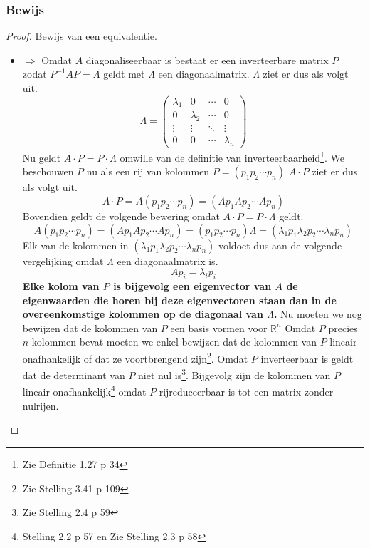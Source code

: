 \documentclass[lineaire_algebra_oplossingen.tex]{subfiles}
\begin{document}
\subsubsection*{Bewijs}
\begin{proof}
Bewijs van een equivalentie.
\begin{itemize}
\item $\Rightarrow$
Omdat $A$ diagonaliseerbaar is bestaat er een inverteerbare matrix $P$ zodat $P^{-1}AP = \Lambda$ geldt met $\Lambda$ een diagonaalmatrix. $\Lambda$ ziet er dus als volgt uit.
\[
\Lambda =
\begin{pmatrix}
\lambda_1 & 0 & \cdots & 0\\
0 & \lambda_2 & \cdots & 0\\
\vdots & \vdots & \ddots & \vdots\\
0 & 0 & \cdots & \lambda_n
\end{pmatrix}
\]
Nu geldt $A \cdot P = P \cdot \Lambda$ omwille van de definitie van inverteerbaarheid\footnote{Zie Definitie 1.27 p 34}.
We beschouwen $P$ nu als een rij van kolommen $P=(p_1 p_2 \cdots p_n)$
$A\cdot P$ ziet er dus als volgt uit.
\[
A\cdot P = A(p_1 p_2 \cdots p_n) = (Ap_1 Ap_2 \cdots Ap_n)
\]
Bovendien geldt de volgende bewering omdat $A \cdot P = P \cdot \Lambda$ geldt.
\[
A(p_1 p_2 \cdots p_n) = (Ap_1 Ap_2 \cdots Ap_n) = (p_1 p_2 \cdots p_n)\Lambda = (\lambda_1p_1 \lambda_2p_2 \cdots \lambda_np_n)
\]
Elk van de kolommen in $(\lambda_1p_1 \lambda_2p_2 \cdots \lambda_np_n)$ voldoet dus aan de volgende vergelijking omdat $\Lambda$ een diagonaalmatrix is.
\[
Ap_i = \lambda_ip_i
\]
\textbf{Elke kolom van $P$ is bijgevolg een eigenvector van $A$ de eigenwaarden die horen bij deze eigenvectoren staan dan in de overeenkomstige kolommen op de diagonaal van $\Lambda$.}
Nu moeten we nog bewijzen dat de kolommen van $P$ een basis vormen voor $\mathbb{R}^n$
Omdat $P$ precies $n$ kolommen bevat moeten we enkel bewijzen dat de kolommen van $P$ lineair onafhankelijk of dat ze voortbrengend zijn\footnote{Zie Stelling 3.41 p 109}.
Omdat $P$ inverteerbaar is geldt dat de determinant van $P$ niet nul is\footnote{Zie Stelling 2.4 p 59}.
Bijgevolg zijn de kolommen van $P$ lineair onafhankelijk\footnote{Stelling 2.2 p 57 en Zie Stelling 2.3 p 58} omdat $P$ rijreduceerbaar is tot een matrix zonder nulrijen.


\end{itemize}
\end{proof}
\end{document}
